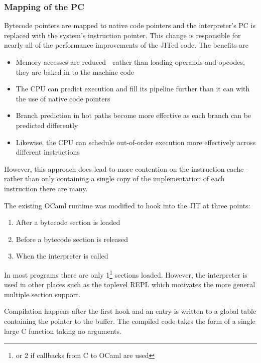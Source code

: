 \subsubsection{Mapping of the PC}

Bytecode pointers are mapped to native code pointers and the interpreter's PC is replaced with the
system's instruction pointer. This change is responsible for nearly all of the performance
improvements of the JITed code. The benefits are

\begin{itemize}
      \item Memory accesses are reduced - rather than loading operands and opcodes, they are baked
            in to the machine code
      \item The CPU can predict execution and fill its pipeline further than it can with the use of
            native code pointers
      \item Branch prediction in hot paths become more effective as each branch can be predicted
            differently
      \item Likewise, the CPU can schedule out-of-order execution more effectively across different
            instructions
\end{itemize}

However, this approach does lead to more contention on the instruction cache - rather than only
containing a single copy of the implementation of each instruction there are many.


The existing OCaml runtime was modified to hook into the JIT at three points:

\begin{enumerate}
      \item After a bytecode section is loaded
      \item Before a bytecode section is released
      \item When the interpreter is called
\end{enumerate}

In most programs there are only 1\footnote{or 2 if callbacks from C to OCaml are used} sections
loaded. However, the interpreter is used in other places such as the toplevel REPL which motivates
the more general multiple section support.

Compilation happens after the first hook and an entry is written to a global table containing the
pointer to the buffer. The compiled code takes the form of a single large C function taking no
arguments.

